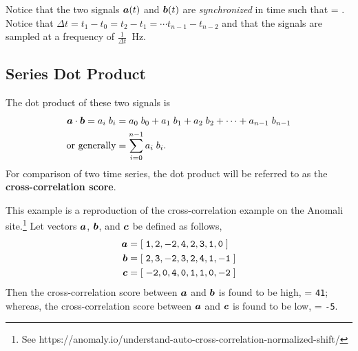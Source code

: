\begin{Hremark}
Notice that the two signals 
$\mbox{\boldmath $a$}(t)$ and $\mbox{\boldmath $b$}(t)$ are {\em synchronized} in time
such that 
\be
\vt= .
\ee
Notice that $\Delta t = t_1 - t_0 = t_2 - t_1 = \cdots
t_{n-1} - t_{n-2}$ and that the signals
are sampled at a frequency 
of $\frac{1}{\Delta t}$~Hz.
\end{Hremark}

\subsection{Series Dot Product}
The dot product of these two signals is
\begin{align}
 \mbox{\boldmath $a$} \cdot \mbox{\boldmath $b$} = a_i \; b_i 
 & = a_0 \; b_0 + a_1 \; b_1 + a_2 \; b_2 + \cdots + 
 a_{n-1} \; b_{n-1} \\
 \mbox{or generally} 
 & = 
 \sum_{i=0}^{n-1} a_i \; b_i.
\end{align}
For comparison of two time series, the dot product will be referred 
to as the {\bf cross-correlation score}.

\begin{Hexample}
	{
    This example is a reproduction of the cross-correlation 
    example on the Anomali site.\footnote{See 
https://anomaly.io/understand-auto-cross-correlation-normalized-shift/}
	Let vectors $\mbox{\boldmath $a$}$, $\mbox{\boldmath $b$}$, and $\mbox{\boldmath $c$}$ be defined as follows,
	\begin{align}
		\mbox{\boldmath $a$} &= {\tt [\; 1, 2, -2, 4, 2, 3, 1, 0 \;]} \\
		\mbox{\boldmath $b$} &= {\tt [\; 2, 3, -2, 3, 2, 4, 1, -1 \; ]} \\
		\mbox{\boldmath $c$} &= {\tt [\; -2, 0, 4, 0, 1, 1, 0, -2 \;]}
	\end{align}
	Then the cross-correlation score between $\mbox{\boldmath $a$}$ and $\mbox{\boldmath $b$}$ is found to be 
	high, 
	\be
	\va \cdot \vb = {\tt 41}; 
	\ee
	whereas, the cross-correlation score between $\mbox{\boldmath $a$}$ and $\mbox{\boldmath $c$}$ is found to 
	be low, 
	\be
	\va \cdot \vc = {\tt -5}.
	\ee
	}
\end{Hexample}

\clearpage

